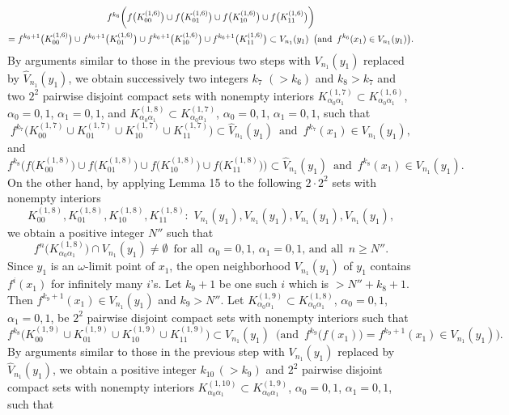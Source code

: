 \documentclass[12pt]{article}
\newcommand{\al}{\alpha}
\begin{document}
\begin{multline*}
$$
f^{k_6}\bigg(f\big(K_{00}^{(1,6)}\big) \cup f\big(K_{01}^{(1,6)}\big) \cup f\big(K_{10}^{(1,6)}\big) \cup f\big(K_{11}^{(1,6)}\big)\bigg) \\ = f^{k_6+1}\big(K_{00}^{(1,6)}\big) \cup f^{k_6+1}\big(K_{01}^{(1,6)}\big) \cup f^{k_6+1}\big(K_{10}^{(1,6)}\big) \cup f^{k_6+1}\big(K_{11}^{(1,6)}\big)\subset V_{n_1}(y_1) \,\,\, \big(\text{and} \,\,\, f^{k_6}(x_1) \in V_{n_1}(y_1)\big).
$$
\end{multline*}
\indent By arguments similar to those in the previous two steps with $V_{n_1}(y_1)$ replaced by $\widehat V_{n_1}(y_1)$, we obtain successively two integers $k_7$ $(> k_6)$ and $k_8 > k_7$ and two $2^2$ pairwise disjoint compact sets with nonempty interiors $K_{\al_0\al_1}^{(1,7)} \subset K_{\al_0\al_1}^{(1,6)}$, $\al_0 = 0, 1$, $\al_1 = 0, 1$, and $K_{\al_0\al_1}^{(1,8)} \subset K_{\al_0\al_1}^{(1,7)}$, $\al_0 = 0, 1$, $\al_1 = 0, 1$, such that 
$$
f^{k_7}\big(K_{00}^{(1,7)} \cup K_{01}^{(1,7)} \cup K_{10}^{(1,7)} \cup K_{11}^{(1,7)}\big) \subset \widehat V_{n_1}(y_1) \,\,\, \text{and} \,\,\, f^{k_7}(x_1) \in V_{n_1}(y_1),
$$and
$$
f^{k_8}\bigg(f\big(K_{00}^{(1,8)}\big) \cup f\big(K_{01}^{(1,8)}\big) \cup f\big(K_{10}^{(1,8)}\big) \cup f\big(K_{11}^{(1,8)}\big)\bigg) \subset \widehat V_{n_1}(y_1) \,\,\, \text{and} \,\,\, f^{k_8}(x_1) \in V_{n_1}(y_1).
$$
\indent On the other hand, by applying Lemma 15 to the following $2 \cdot 2^2$ sets with nonempty interiors
$$
K_{00}^{(1,8)}, K_{01}^{(1,8)}, K_{10}^{(1,8)}, K_{11}^{(1,8)}: \,\, V_{n_1}(y_1), V_{n_1}(y_1), V_{n_1}(y_1), V_{n_1}(y_1),
$$ 
we obtain a positive integer $N''$ such that 
$$
f^n\big(K_{\al_0\al_1}^{(1,8)}\big) \cap V_{n_1}(y_1) \ne \emptyset \,\,\, \text{for all} \,\,\, \al_0 = 0, 1, \, \al_1 = 0, 1, \, \text{and all} \,\,\, n \ge N''.
$$
\indent Since $y_1$ is an $\omega$-limit point of $x_1$, the open neighborhood $V_{n_1}(y_1)$ of $y_1$ contains $f^i(x_1)$ for infinitely many $i$'s.  Let $k_9+1$ be one such $i$ which is $> N''+k_8+1$.  Then $f^{k_9+1}(x_1) \in V_{n_1}(y_1)$ and $k_9 > N''$.  Let $K_{\al_0\al_1}^{(1,9)} \subset K_{\al_0\al_1}^{(1,8)}$, $\al_0 = 0, 1$, $\al_1 = 0, 1$, be $2^2$ pairwise disjoint compact sets with nonempty interiors such that 
$$
f^{k_8}\big(K_{00}^{(1,9)} \cup K_{01}^{(1,9)} \cup K_{10}^{(1,9)} \cup K_{11}^{(1,9)}\big) \subset V_{n_1}(y_1) \,\,\, \bigg(\text{and} \,\,\, f^{k_9}\big(f(x_1)\big) = f^{k_9+1}(x_1) \in V_{n_1}(y_1)\bigg).
$$
\indent By arguments similar to those in the previous step with $V_{n_1}(y_1)$ replaced by $\widehat V_{n_1}(y_1)$, we obtain a positive integer $k_{10} \, (> k_9)$ and $2^2$ pairwise disjoint compact sets with nonempty interiors $K_{\al_0\al_1}^{(1,10)} \subset K_{\al_0\al_1}^{(1,9)}$, $\al_0 = 0, 1$, $\al_1 = 0, 1$, such that
\end{document}

